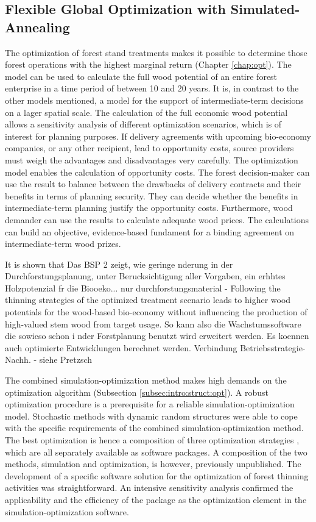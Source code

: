 \subsection{Flexible Global Optimization with Simulated-Annealing}
\label{subsec:discussion:struct:opt}
The optimization of forest stand treatments makes it possible to determine those forest operations with the highest marginal return (Chapter \ref{chap:opt}). The model can be used to calculate the full wood potential of an entire forest enterprise in a time period of between 10 and 20 years. It is, in contrast to the other models mentioned, a model for the support of intermediate-term decisions on a lager spatial scale. The calculation of the full economic wood potential allows a sensitivity analysis of different optimization scenarios, which is of interest for planning purposes. If delivery agreements with upcoming bio-economy companies, or any other recipient, lead to opportunity costs, source providers must weigh the advantages and disadvantages very carefully. The optimization model enables the calculation of opportunity costs. The forest decision-maker can use the result to balance between the drawbacks of delivery contracts and their benefits in terms of planning security. They can decide whether the benefits in intermediate-term planning justify the opportunity costs. Furthermore, wood demander can use the results to calculate adequate wood prices. The calculations can build an objective, evidence-based fundament for a binding agreement on intermediate-term wood prizes.

It is shown that 
Das BSP 2 zeigt, wie geringe nderung in der Durchforstungsplanung, unter Berucksichtigung aller Vorgaben, ein erhhtes Holzpotenzial fr die Biooeko... nur durchforstungsmaterial - Following the thinning strategies of the optimized treatment scenario leads to higher wood potentials for the wood-based bio-economy without influencing the production of high-valued stem wood from target usage. 
So kann also die Wachstumssoftware die sowieso schon i nder Forstplanung benutzt wird erweitert werden. Es koennen auch optimierte Entwicklungen berechnet werden.
Verbindung Betriebsstrategie- Nachh. - siehe Pretzsch

The combined si\-mu\-la\-tion-op\-ti\-mi\-za\-tion method makes high demands on the optimization algorithm (Subsection \ref{subsec:intro:struct:opt}). A robust optimization procedure is a prerequisite for a reliable si\-mu\-la\-tion-op\-ti\-mi\-za\-tion model. Stochastic methods with dynamic random structures were able to cope with the specific requirements of the combined si\-mu\-la\-tion-op\-ti\-mi\-za\-tion method. The best optimization is hence a composition of three optimization strategies \citep{corana_1987, kirkpatrick_1983, pronzato_1984}, which are all separately available as software packages. A composition of the two methods, simulation and optimization, is however, previously unpublished. The development of a specific software solution for the optimization of forest thinning activities was straightforward. An intensive sensitivity analysis confirmed the applicability and the efficiency of the package as the optimization element in the si\-mu\-la\-tion-op\-ti\-mi\-za\-tion software.

